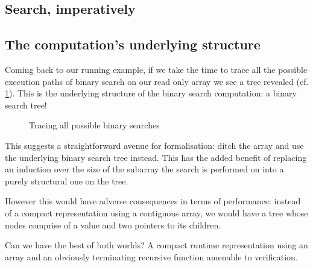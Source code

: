 \documentclass{article}
\begin{document}
\subsection{Search, imperatively}



\subsection{The computation's underlying structure}


Coming back to our running example, if we take the time to trace all the possible
execution paths of binary search on our read only array we see a tree revealed
(cf. \cref{fig:searchall}).
This is the underlying structure of the binary search computation: a binary search
tree! 

\begin{figure}
  \center
  \caption{Tracing all possible binary searches}
  \label{fig:searchall}
\end{figure}

This suggests a straightforward avenue for formalisation: ditch the array and
use the underlying binary search tree instead. This has the added benefit of
replacing an induction over the size of the subarray the search is performed on
into a purely structural one on the tree.

However this would have adverse consequences in terms of performance: instead of
a compact representation using a contiguous array, we would have a tree whose nodes
comprise of a value and two pointers to its children.

Can we have the best of both worlds? A compact runtime representation using an
array and an obviously terminating recursive function amenable to verification.

\section{}



\end{document}
